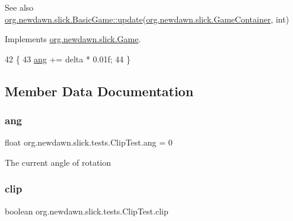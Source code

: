 \begin{DoxySeeAlso}{See also}
\mbox{\hyperlink{classorg_1_1newdawn_1_1slick_1_1_basic_game_acfe6fa05aef83bff1631af91a3e4bd20}{org.\+newdawn.\+slick.\+Basic\+Game\+::update}}(\mbox{\hyperlink{classorg_1_1newdawn_1_1slick_1_1_game_container}{org.\+newdawn.\+slick.\+Game\+Container}}, int) 
\end{DoxySeeAlso}


Implements \mbox{\hyperlink{interfaceorg_1_1newdawn_1_1slick_1_1_game_ab07b2e9463ee4631620dde0de25bdee8}{org.\+newdawn.\+slick.\+Game}}.


\begin{DoxyCode}
42                                   \{
43         \mbox{\hyperlink{classorg_1_1newdawn_1_1slick_1_1tests_1_1_clip_test_ad8fb51467f9faad1ce1cc9dbd039ceb0}{ang}} += delta * 0.01f;
44     \}
\end{DoxyCode}


\subsection{Member Data Documentation}
\mbox{\label{classorg_1_1newdawn_1_1slick_1_1tests_1_1_clip_test_ad8fb51467f9faad1ce1cc9dbd039ceb0}} 
\subsubsection{\texorpdfstring{ang}{ang}}
{\footnotesize\ttfamily float org.\+newdawn.\+slick.\+tests.\+Clip\+Test.\+ang = 0\hspace{0.3cm}{\ttfamily [private]}}

The current angle of rotation \mbox{\label{classorg_1_1newdawn_1_1slick_1_1tests_1_1_clip_test_a598119e064382ed677267a941ed7cfba}} 
\subsubsection{\texorpdfstring{clip}{clip}}
{\footnotesize\ttfamily boolean org.\+newdawn.\+slick.\+tests.\+Clip\+Test.\+clip\hspace{0.3cm}{\ttfamily [private]}}

